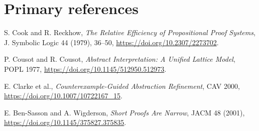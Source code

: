 \documentclass[11pt]{article}
\begin{document}
\section*{Primary references}
\noindent[1] S. Cook and R. Reckhow, \emph{The Relative Efficiency of Propositional Proof Systems}, J. Symbolic Logic 44 (1979), 36--50, \url{https://doi.org/10.2307/2273702}.\par
\noindent[2] P. Cousot and R. Cousot, \emph{Abstract Interpretation: A Unified Lattice Model}, POPL 1977, \url{https://doi.org/10.1145/512950.512973}.\par
\noindent[3] E. Clarke et al., \emph{Counterexample-Guided Abstraction Refinement}, CAV 2000, \url{https://doi.org/10.1007/10722167_15}.\par
\noindent[4] E. Ben-Sasson and A. Wigderson, \emph{Short Proofs Are Narrow}, JACM 48 (2001), \url{https://doi.org/10.1145/375827.375835}.\par
\end{document}
